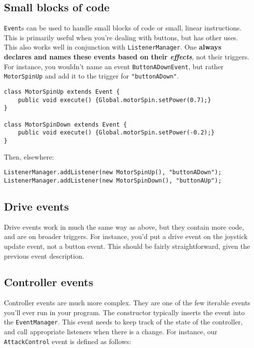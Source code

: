 \documentclass[a4paper]{article}
\begin{document}
\subsection{Small blocks of code}

\lstinline{Event}s can be used to handle small blocks of code or small, linear instructions. This is primarily useful when you're dealing with buttons, but has other uses. This also works well in conjunction with \lstinline{ListenerManager}. One \textbf{always declares and names these events based on their \textit{effects}}, not their triggers. For instance, you wouldn't name an event \lstinline{ButtonADownEvent}, but rather \lstinline{MotorSpinUp} and add it to the trigger for \lstinline{"buttonADown"}. 

\begin{lstlisting}
class MotorSpinUp extends Event {
	public void execute() {Global.motorSpin.setPower(0.7);}
}

class MotorSpinDown extends Event {
	public void execute() {Global.motorSpin.setPower(-0.2);}
}
\end{lstlisting}

Then, elsewhere:

\begin{lstlisting}
ListenerManager.addListener(new MotorSpinUp(), "buttonADown");
ListenerManager.addListener(new MotorSpinDown(), "buttonAUp");
\end{lstlisting}

\subsection{Drive events}

Drive events work in much the same way as above, but they contain more code, and are on broader triggers. For instance, you'd put a drive event on the joystick update event, not a button event. This should be fairly straightforward, given the previous event description. 

\subsection{Controller events}

Controller events are much more complex. They are one of the few iterable events you'll ever run in your program. The constructor typically inserts the event into the \lstinline{EventManager}. This event needs to keep track of the state of the controller, and call appropriate listeners when there is a change. For instance, our \lstinline{AttackControl} event is defined as follows:
\end{document}
